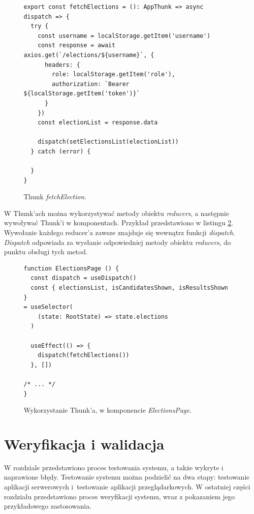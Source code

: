 \documentclass[a4paper,12pt]{book}
\begin{document}
\begin{figure}[H]
\centering
\begin{lstlisting}[style=ES6]
export const fetchElections = (): AppThunk => async dispatch => {
  try {
    const username = localStorage.getItem('username')
    const response = await axios.get(`/elections/${username}`, {
      headers: {
        role: localStorage.getItem('role'),
        authorization: `Bearer ${localStorage.getItem('token')}`
      }
    })
    const electionList = response.data

    dispatch(setElectionsList(electionList))
  } catch (error) {

  }
}
\end{lstlisting}
\caption{Thunk \textit{fetchElection}.}
\label{fetch}
\end{figure}

W Thunk'ach można wykorzystywać metody obiektu \textit{reducers}, a następnie wywoływać Thunk'i w komponentach. Przykład przedstawiono w listingu \ref{ElectionPage}. Wywołanie każdego reducer'a zawsze znajduje się wewnątrz funkcji \textit{dispatch}. \textit{Dispatch} odpowiada za wysłanie odpowiedniej metody obiektu \textit{reducers}, do punktu obsługi tych metod.

\begin{figure}[H]
\centering
\begin{lstlisting}[style=ES6]
function ElectionsPage () {
  const dispatch = useDispatch()
  const { electionsList, isCandidatesShown, isResultsShown } 
= useSelector(
    (state: RootState) => state.elections
  )

  useEffect(() => {
    dispatch(fetchElections())
  }, [])

/* ... */
}
\end{lstlisting}
\caption{Wykorzystanie Thunk'a, w komponencie \textit{ElectionsPage}.}
\label{ElectionPage}
\end{figure}

\chapter{Weryfikacja i walidacja}

W rozdziale przedstawiono proces testowania systemu, a także wykryte i naprawione błędy. Testowanie systemu można podzielić na dwa etapy: testowanie aplikacji serwerowych i~testowanie aplikacji przeglądarkowych. W ostatniej części
rozdziału przedstawiono proces weryfikacji systemu, wraz z pokazaniem jego przykładowego zastosowania.
\end{document}

